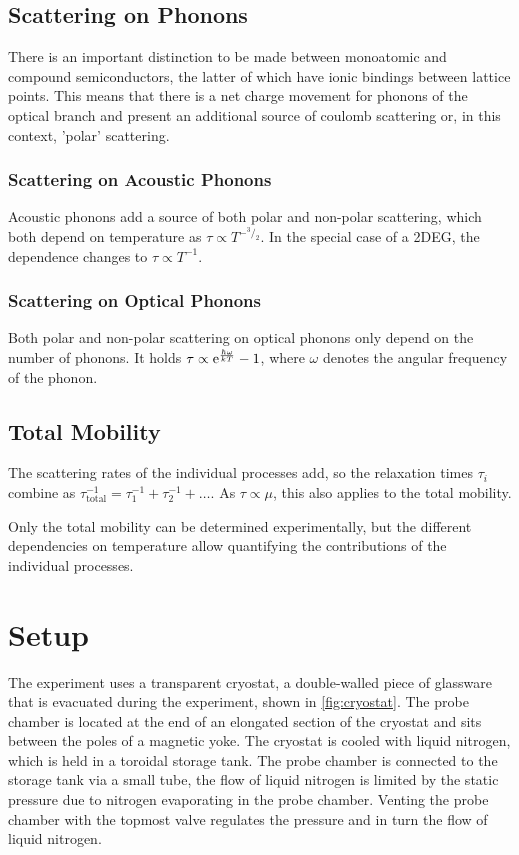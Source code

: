 \subsection{Scattering on Phonons}
There is an important distinction to be made between monoatomic and compound semiconductors, the latter of which have ionic bindings between lattice points.
This means that there is a net charge movement for phonons of the optical branch and present an additional source of coulomb scattering or, in this context, 'polar' scattering.

\subsubsection{Scattering on Acoustic Phonons}
Acoustic phonons add a source of both polar and non-polar scattering, which both depend on temperature as $\tau \propto T^{-{^3}/_2}$.
In the special case of a 2DEG, the dependence changes to $\tau \propto T^{-1}$.

\subsubsection{Scattering on Optical Phonons}
Both polar and non-polar scattering on optical phonons only depend on the number of phonons.
It holds $\tau \propto \mathrm{e}^\frac{\hbar \omega}{k T} - 1$, where $\omega$ denotes the angular frequency of the phonon.

\subsection{Total Mobility}
The scattering rates of the individual processes add, so the relaxation times $\tau_i$ combine as $\tau_\text{total}^{-1} = \tau_1^{-1} + \tau_2^{-1} + \dots$.
As $\tau \propto \mu$, this also applies to the total mobility.

Only the total mobility can be determined experimentally, but the different dependencies on temperature allow quantifying the contributions of the individual processes.

\section{Setup}
The experiment uses a transparent cryostat, a double-walled piece of glassware that is evacuated during the experiment, shown in \autoref{fig:cryostat}.
The probe chamber is located at the end of an elongated section of the cryostat and sits between the poles of a magnetic yoke.
The cryostat is cooled with liquid nitrogen, which is held in a toroidal storage tank.
The probe chamber is connected to the storage tank via a small tube, the flow of liquid nitrogen is limited by the static pressure due to nitrogen evaporating in the probe chamber.
Venting the probe chamber with the topmost valve regulates the pressure and in turn the flow of liquid nitrogen.

